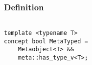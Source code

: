 
\subsubsection{Definition}

\begin{verbatim}

template <typename T>
concept bool MetaTyped =
	Metaobject<T> &&
	meta::has_type_v<T>;

\end{verbatim}
